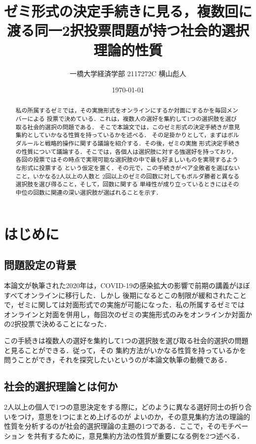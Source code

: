 \documentclass[dvipdfmx]{jsarticle}
\begin{document}
\title{ゼミ形式の決定手続きに見る，複数回に渡る同一2択投票問題が持つ社会的選択理論的性質}
\author{一橋大学経済学部 2117272C 横山彪人}
\date{\today}
\maketitle

\begin{abstract}
  私の所属するゼミでは，その実施形式をオンラインにするか対面にするかを毎回メンバーによる
  投票で決めている．これは，複数人の選好を集約して1つの選択肢を選び取る社会的選択の問題である．
  そこで本論文では，このゼミ形式の決定手続きが意見集約としていかなる性質を持っているかを述べる．
  その足掛かりとして，まずはボルダルールと戦略的操作に関する議論を紹介する．その後，ゼミの実施
  形式決定手続きの性質について議論する．そこでは，各個人は選択肢に対する強選好を持っており，
  各回の投票ではその時点で実現可能な選択肢の中で最も好ましいものを実現するような形式に投票する
  という仮定を置く．その元で，この手続きがペア全敗者を選ばないこと，いかなる2人以上の人数と
  2回以上のゼミの回数に対してもボルダ勝者と異なる選択肢を選び得ること，そして，回数に関する
  単峰性が成り立っているときにはその中位の回数に関連の深い選択肢が選ばれることを示す．
\end{abstract}

\tableofcontents
\clearpage

\section{はじめに}
\subsection{問題設定の背景}
本論文が執筆された2020年は，COVID-19の感染拡大の影響で前期の講義がほぼすべてオンラインに移行した．しかし
後期になるとこの制限が緩和されたことで，ゼミに関しては対面形式での実施が可能になった．私の所属するゼミでは
オンラインと対面を併用し，毎回次のゼミの実施形式のみをオンラインか対面かの2択投票で決めることになった．

この手続きは複数人の選好を集約して1つの選択肢を選び取る社会的選択の問題と見ることができる．従って，その
集約方法がいかなる性質を持っているかを問うことができ，それを探究したいというのが本論文執筆の動機である．

\subsection{社会的選択理論とは何か}
2人以上の個人で1つの意思決定をする際に，どのように異なる選好同士の折り合いをつけ，意思を1つにまとめ上げるのが
よいのか，その意見集約方法の理論的性質を分析するのが社会的選択理論の主題の1つである．ここで，そのモチベーション
を共有するために，意見集約方法の性質が重要になる例を2つ述べる．
\end{document}

